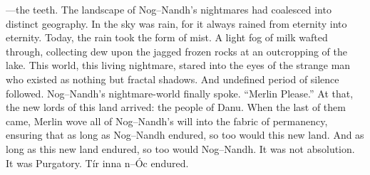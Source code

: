 \simpleline


\mbox{---}the teeth. The landscape of Nog\mbox{--}Nandh’s nightmares had coalesced into distinct geography. In the sky was rain, for it always rained from eternity into eternity. Today, the rain took the form of mist. A light fog of milk wafted through, collecting dew upon the jagged frozen rocks at an outcropping of the lake.
\SmallVSpace
This world, this living nightmare, stared into the eyes of the strange man who existed as nothing but fractal shadows. And undefined period of silence followed. Nog\mbox{--}Nandh’s nightmare-world finally spoke.
\SmallVSpace
“Merlin{\el} Please.”
\SmallVSpace
At that, the new lords of this land arrived: the people of Danu. When the last of them came, Merlin wove all of Nog\mbox{--}Nandh’s will into the fabric of permanency, ensuring that as long as Nog\mbox{--}Nandh endured, so too would this new land. And as long as this new land endured, so too would Nog\mbox{--}Nandh. It was not absolution. It was Purgatory.
\SomeVSpace
Tír inna n\mbox{--}Óc endured. %